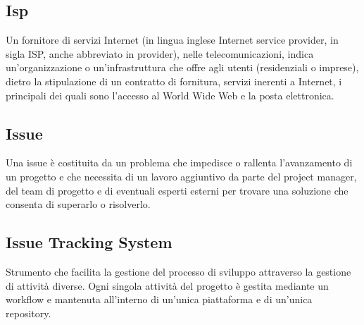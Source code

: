 \subsection*{Isp}
Un fornitore di servizi Internet (in lingua inglese Internet service provider, in sigla ISP, anche abbreviato in provider), nelle telecomunicazioni, indica un'organizzazione o un'infrastruttura che offre agli utenti (residenziali o imprese), dietro la stipulazione di un contratto di fornitura, servizi inerenti a Internet, i principali dei quali sono l'accesso al World Wide Web e la posta elettronica.

\subsection*{Issue}
Una issue è costituita da un problema che impedisce o rallenta l’avanzamento di un progetto e che necessita di un lavoro aggiuntivo da parte del project manager, del team di progetto e di eventuali esperti esterni per trovare una soluzione che consenta di superarlo o risolverlo.

\subsection*{Issue Tracking System}
Strumento che facilita la gestione del processo di sviluppo attraverso la gestione di attività diverse.
Ogni singola attività del progetto è gestita mediante un workflow e mantenuta all’interno di un’unica piattaforma e di un’unica repository.

